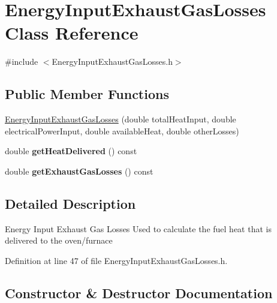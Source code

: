 \hypertarget{class_energy_input_exhaust_gas_losses}{}\section{Energy\+Input\+Exhaust\+Gas\+Losses Class Reference}
\label{class_energy_input_exhaust_gas_losses}


{\ttfamily \#include $<$Energy\+Input\+Exhaust\+Gas\+Losses.\+h$>$}

\subsection*{Public Member Functions}
\begin{DoxyCompactItemize}
\item 
\hyperlink{class_energy_input_exhaust_gas_losses_af415ddb1b676a0a43edbe28d7fc9520c}{Energy\+Input\+Exhaust\+Gas\+Losses} (double total\+Heat\+Input, double electrical\+Power\+Input, double available\+Heat, double other\+Losses)
\item 
\mbox{\label{class_energy_input_exhaust_gas_losses_a139f89d11cb663632ee9ccc27e242b07}} 
double {\bfseries get\+Heat\+Delivered} () const
\item 
\mbox{\label{class_energy_input_exhaust_gas_losses_aff089e129d329769d895e489928eb059}} 
double {\bfseries get\+Exhaust\+Gas\+Losses} () const
\end{DoxyCompactItemize}


\subsection{Detailed Description}
Energy Input Exhaust Gas Losses Used to calculate the fuel heat that is delivered to the oven/furnace 

Definition at line 47 of file Energy\+Input\+Exhaust\+Gas\+Losses.\+h.



\subsection{Constructor \& Destructor Documentation}
\mbox{\label{class_energy_input_exhaust_gas_losses_af415ddb1b676a0a43edbe28d7fc9520c}} 
